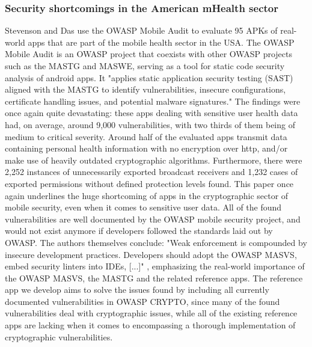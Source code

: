 \subsubsection{Security shortcomings in the American mHealth sector}
Stevenson and Das \citep{paper_14} use the OWASP Mobile Audit to evaluate 95 APKs of real-world apps that are part of the mobile health sector in the USA. The OWASP Mobile Audit is an OWASP project that coexists with other OWASP projects such as the MASTG and MASWE, serving as a tool for static code security analysis of android apps.  It "applies static application security testing (SAST) aligned with the MASTG to identify vulnerabilities, insecure configurations, certificate handling issues, and potential malware signatures." The findings were once again quite devastating: these apps dealing with sensitive user health data had, on average, around 9,000 vulnerabilities, with two thirds of them being of medium to critical severity. Around half of the evaluated apps transmit data containing personal health information with no encryption over http, and/or make use of heavily outdated cryptographic algorithms. Furthermore, there were 2,252 instances of unnecessarily exported broadcast receivers and 1,232 cases of exported permissions without defined protection levels found. This paper once again underlines the huge shortcoming of apps in the cryptographic sector of mobile security, even when it comes to sensitive user data. All of the found vulnerabilities are well documented by the OWASP mobile security project, and would not exist anymore if developers followed the standards laid out by OWASP. The authors themselves conclude:  "Weak enforcement is compounded by insecure development practices. Developers should adopt the OWASP MASVS, embed security linters into IDEs, [...]" \citep{paper_14}, emphasizing the real-world importance of the OWASP MASVS, the MASTG and the related reference apps.  The reference app we develop aims to solve the issues found by including all currently documented vulnerabilities in OWASP CRYPTO, since many of the found vulnerabilities deal with cryptographic issues, while all of the existing reference apps are lacking when it comes to encompassing a thorough implementation of cryptographic vulnerabilities.

